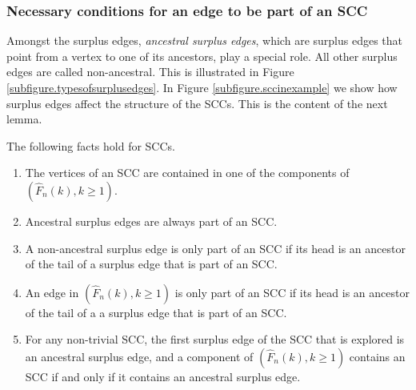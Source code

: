 \subsubsection{Necessary conditions for an edge to be part of an SCC}\label{subsubsec.defcandidates}
Amongst the surplus edges, \emph{ancestral surplus edges}, which are surplus edges that point from a vertex to one of its ancestors, play a special role. All other surplus edges are called non-ancestral. This is illustrated in Figure \ref{subfigure.typesofsurplusedges}. In Figure \ref{subfigure.sccinexample} we show how surplus edges affect the structure of the SCCs. This is the content of the next lemma.
\begin{lemma}\label{lemma.whatispartofscc}
The following facts hold for SCCs. 
\begin{enumerate}
\item \label{item.factsonsccs1}The vertices of an SCC are contained in one of the components of {$(\hat{F}_n(k),k\geq 1)$}. 
\item \label{item.factsonsccs2} Ancestral surplus edges are always part of an SCC.
\item \label{item.factsonsccs4} A non-ancestral surplus edge is only part of an SCC if its head is an ancestor of the tail of a surplus edge that is part of an SCC.
\item \label{item.factsonsccs4andabit} An edge in $(\hat{F}_n(k),k\geq 1)$ is only part of an SCC if its head is an ancestor of the tail of a a surplus edge that is part of an SCC.
\item \label{item.factsonsccs5} For any non-trivial SCC, the first surplus edge of the SCC that is explored is an ancestral surplus edge, and a component of  $(\hat{F}_n(k),k\geq 1)$ contains an SCC if and only if it contains an ancestral surplus edge.
\end{enumerate}
\end{lemma}
